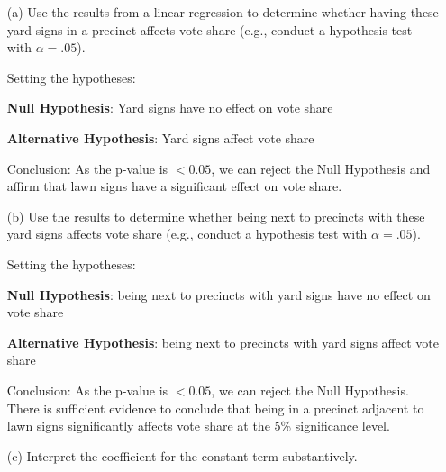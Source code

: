 \documentclass[12pt,letterpaper]{article}
\begin{document}
\vspace{.5cm}
\begin{enumerate}
	\item [(a)] Use the results from a linear regression to determine whether having these yard signs in a precinct affects vote share (e.g., conduct a hypothesis test with $\alpha = .05$).
	\vspace{.5cm}
	
	Setting the hypotheses:
	
	\textbf{Null Hypothesis}: Yard signs have no effect on vote share
	
	\textbf{Alternative Hypothesis}: Yard signs affect vote share
	
	\vspace{.3cm}
		
	  
	\vspace{.2cm}
	
	Conclusion: As the p-value is $< 0.05$, we can reject the Null Hypothesis and affirm that lawn signs have a significant effect on vote share.
	
	
\vspace{1cm}
	
	
	\item [(b)]  Use the results to determine whether being
	next to precincts with these yard signs affects vote
	share (e.g., conduct a hypothesis test with $\alpha = .05$).
	\vspace{.5cm}
		
	Setting the hypotheses:
	
	\textbf{Null Hypothesis}: being next to precincts with yard signs have no effect on vote share
	
	\textbf{Alternative Hypothesis}: being next to precincts with yard signs affect vote share
	\vspace{.3cm}
	
	  
	
	\vspace{.2cm}
		
	Conclusion: As the p-value is $< 0.05$, we can reject the Null Hypothesis. There is sufficient evidence to conclude that being in a precinct adjacent to lawn signs significantly affects vote share at the 5\% significance level.
	
	
\newpage
	
	\item [(c)] Interpret the coefficient for the constant term substantively.
	\vspace{.5cm}
	

\end{enumerate}
\end{document}

